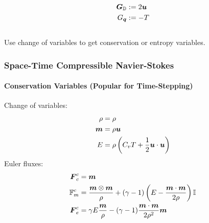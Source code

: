 \documentclass[18pt,xcolor=table]{beamer}
\begin{document}
\begin{frame}[t]
\begin{columns}[t]
\begin{column}{0.3\textwidth}
\begin{align*}
\boldsymbol G_{\mathbb{D}}&:=2\boldsymbol u\\
G_{\boldsymbol q}&:=-T\\
\end{align*}
\end{column} 
\end{columns}
\centering
Use change of variables to get conservation or entropy variables.
\end{frame}


\begin{frame}[t]
\frametitle{Space-Time Compressible Navier-Stokes}
\framesubtitle{Conservation Variables (Popular for Time-Stepping)}
Change of variables:
\begin{align*}
\rho&=\rho\\
\boldsymbol m&=\rho\boldsymbol u\\
E&=\rho\left( C_v T+\frac{1}{2}\boldsymbol u\cdot\boldsymbol u \right)
\end{align*}
Euler fluxes:
\begin{align*}
\boldsymbol F^c_c&=\boldsymbol m\\
\mathbb{F}^c_m&=\frac{\boldsymbol m\otimes\boldsymbol m}{\rho}+(\gamma-1)\left( E-\frac{\boldsymbol m\cdot\boldsymbol m}{2\rho} \right)\mathbb{I}\\
\boldsymbol F^c_e&=\gamma E\frac{\boldsymbol m}{\rho}-(\gamma-1)\frac{\boldsymbol m\cdot\boldsymbol m}{2\rho^2}\boldsymbol m\\
\end{align*}
\end{frame}
\end{document}
